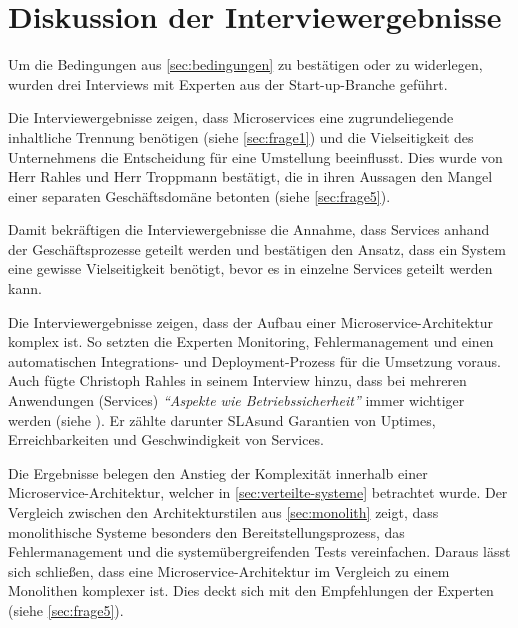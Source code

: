 \section{Diskussion der Interviewergebnisse}
\label{sec:auswertung}

Um die Bedingungen aus \cref{sec:bedingungen} zu bestätigen oder zu widerlegen, wurden drei Interviews mit Experten aus der Start-up-Branche geführt.

Die Interviewergebnisse zeigen, dass Microservices eine zugrundeliegende inhaltliche Trennung benötigen (siehe \cref{sec:frage1}) und die Vielseitigkeit des Unternehmens die Entscheidung für eine Umstellung beeinflusst. Dies wurde von Herr Rahles und Herr Troppmann bestätigt, die in ihren Aussagen den Mangel einer separaten Geschäftsdomäne betonten (siehe \cref{sec:frage5}).

\label{sec:vielseitigkeit}
Damit bekräftigen die Interviewergebnisse die Annahme, dass Services anhand der Geschäftsprozesse geteilt werden und bestätigen den Ansatz, dass ein System eine gewisse Vielseitigkeit benötigt, bevor es in einzelne Services geteilt werden kann.

Die Interviewergebnisse zeigen, dass der Aufbau einer Microservice-Architektur komplex ist. So setzten die Experten Monitoring, Fehlermanagement und einen automatischen Integrations- und Deployment-Prozess für die Umsetzung voraus.
Auch fügte Christoph Rahles in seinem Interview hinzu, dass bei mehreren Anwendungen (Services) \textit{\enquote{Aspekte wie Betriebssicherheit}} immer wichtiger werden (siehe ). Er zählte darunter SLAs\footnotemark und Garantien von Uptimes, Erreichbarkeiten und Geschwindigkeit von Services.


Die Ergebnisse belegen den Anstieg der Komplexität innerhalb einer Microservice-Architektur, welcher in \cref{sec:verteilte-systeme} betrachtet wurde. Der Vergleich zwischen den Architekturstilen aus \cref{sec:monolith} zeigt, dass monolithische Systeme besonders den Bereitstellungsprozess, das Fehlermanagement und die systemübergreifenden Tests vereinfachen. Daraus lässt sich schließen, dass eine Microservice-Architektur im Vergleich zu einem Monolithen komplexer ist. Dies deckt sich mit den Empfehlungen der Experten (siehe \cref{sec:frage5}).

